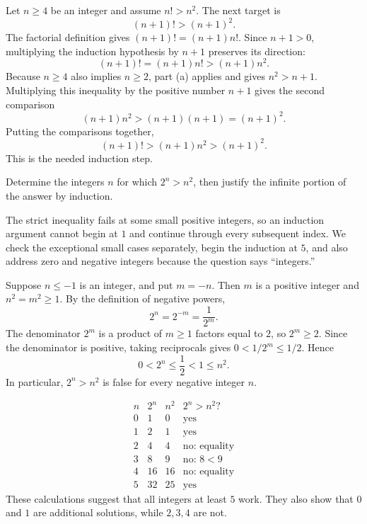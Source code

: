 Let $n\geq4$ be an integer and assume $n!>n^2$. The next target is
\[
 (n+1)!>(n+1)^2.
\]
The factorial definition gives $(n+1)!=(n+1)n!$. Since $n+1>0$,
multiplying the induction hypothesis by $n+1$ preserves its direction:
\[
 (n+1)!=(n+1)n!>(n+1)n^2.
\]
Because $n\geq4$ also implies $n\geq2$, part (a) applies and gives
$n^2>n+1$. Multiplying this inequality by the positive number $n+1$
gives the second comparison
\[
 (n+1)n^2>(n+1)(n+1)=(n+1)^2.
\]
Putting the comparisons together,
\[
 (n+1)!>(n+1)n^2>(n+1)^2.
\]
This is the needed induction step.



\goal Determine the integers $n$ for which $2^n>n^2$, then justify
the infinite portion of the answer by induction.

\idea The strict inequality fails at some small positive integers,
so an induction argument cannot begin at $1$ and continue through every
subsequent index. We check the exceptional small cases separately, begin
the induction at $5$, and also address zero and negative integers because
the question says ``integers.''

Suppose $n\leq-1$ is an integer, and put $m=-n$. Then $m$ is a positive
integer and $n^2=m^2\geq1$. By the definition of negative powers,
\[
 2^n=2^{-m}=\frac1{2^m}.
\]
The denominator $2^m$ is a product of $m\geq1$ factors equal to $2$,
so $2^m\geq2$. Since the denominator is positive, taking reciprocals gives
$0<1/2^m\leq1/2$. Hence
\[
 0<2^n\leq\frac12<1\leq n^2.
\]
In particular, $2^n>n^2$ is false for every negative integer $n$.

\[
\begin{array}{c|r|r|c}
 n&2^n&n^2&2^n>n^2\text{?}\\ \hline
 0&1&0&\text{yes}\\
 1&2&1&\text{yes}\\
 2&4&4&\text{no: equality}\\
 3&8&9&\text{no: }8<9\\
 4&16&16&\text{no: equality}\\
 5&32&25&\text{yes}
\end{array}
\]
These calculations suggest that all integers at least $5$ work. They also
show that $0$ and $1$ are additional solutions, while $2,3,4$ are not.

